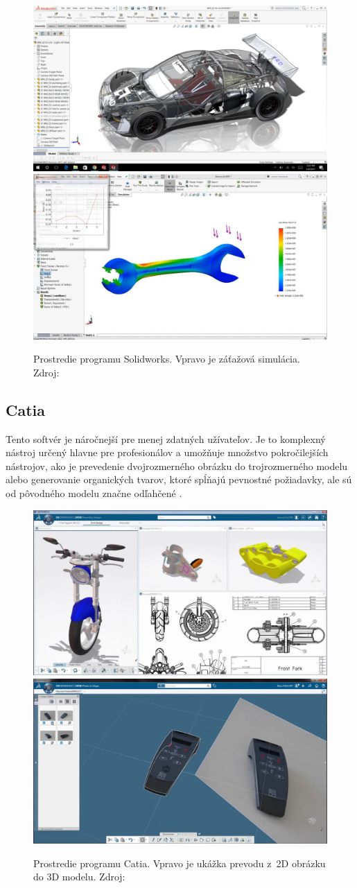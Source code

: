 \begin{figure}[H]
    \centering
    \includegraphics[width = 0.49\linewidth]{obrazky-figures/programs/solidworks_01.png}
    \includegraphics[width = 0.49\linewidth]{obrazky-figures/programs/solidworks, simulation.jpg}
    \caption{Prostredie programu Solidworks. Vpravo je záťažová simulácia. Zdroj: \cite{solidworks_2017} \cite{ames_2017} }
    \label{fig:solidworks_simulations}
\end{figure}


\subsection*{Catia}
Tento softvér je náročnejší pre menej zdatných užívateľov. Je to komplexný nástroj určený hlavne pre profesionálov a umožňuje množstvo pokročilejších nástrojov, ako je prevedenie dvojrozmerného obrázku do trojrozmerného modelu alebo generovanie organických tvarov, ktoré spĺňajú pevnostné požiadavky, ale sú od pôvodného modelu značne odľahčené \cite{technodat_cz_2017}.

\begin{figure}[H]
    \centering
    \includegraphics[width = 0.49\linewidth]{obrazky-figures/programs/Catia.jpg}
    \includegraphics[width = 0.49\linewidth]{obrazky-figures/programs/Catia2.png}
    \caption{Prostredie programu Catia. Vpravo je ukážka prevodu z~2D obrázku do 3D modelu. Zdroj: \cite{technodat_cz_2017} }
    \label{fig:Catia}
\end{figure}


